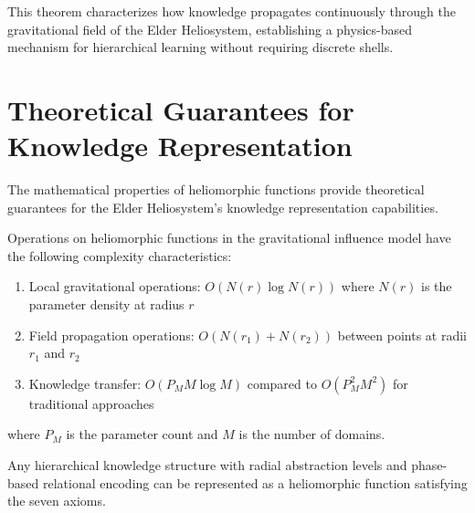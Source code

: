 This theorem characterizes how knowledge propagates continuously through the gravitational field of the Elder Heliosystem, establishing a physics-based mechanism for hierarchical learning without requiring discrete shells.

\section{Theoretical Guarantees for Knowledge Representation}

The mathematical properties of heliomorphic functions provide theoretical guarantees for the Elder Heliosystem's knowledge representation capabilities.

\begin{theorem}
Operations on heliomorphic functions in the gravitational influence model have the following complexity characteristics:
\begin{enumerate}
    \item Local gravitational operations: $O(N(r) \log N(r))$ where $N(r)$ is the parameter density at radius $r$
    \item Field propagation operations: $O(N(r_1) + N(r_2))$ between points at radii $r_1$ and $r_2$
    \item Knowledge transfer: $O(P_M M \log M)$ compared to $O(P_M^2 M^2)$ for traditional approaches
\end{enumerate}
where $P_M$ is the parameter count and $M$ is the number of domains.
\end{theorem}

\begin{theorem}
Any hierarchical knowledge structure with radial abstraction levels and phase-based relational encoding can be represented as a heliomorphic function satisfying the seven axioms.
\end{theorem}

